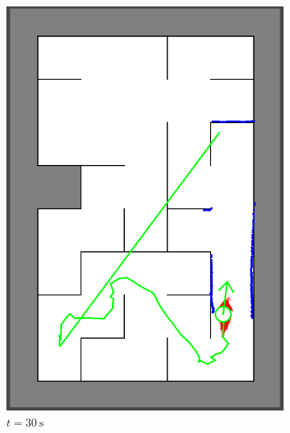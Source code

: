 \begin{figure}[H]
\begin{subfigure}{0.2\textwidth}
         \includegraphics[width=\textwidth]{figures/localization2_30s.png}
         \caption{$t = \SI{30}{\second}$}
         \label{mapping20s}
     \end{subfigure}
     \hspace{1em}
     \begin{subfigure}{0.2\textwidth}
         \centering

\end{subfigure}
\end{figure}
